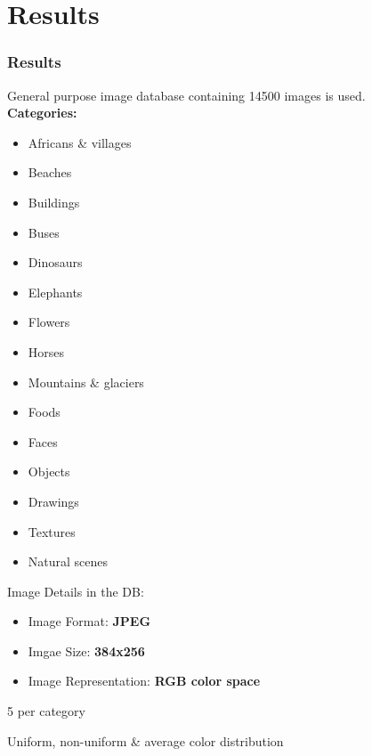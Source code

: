 \documentclass[15pt]{beamer}
\begin{document}
\section{Results}
\begin{frame}
\frametitle{Results}
\pause
General purpose image database containing 14500 images is used.\\[\baselineskip]
\pause
\textbf{Categories: }\\[\baselineskip]
\pause
\begin{multicols}{4}
    \begin{itemize}[label=$\blacksquare$]
        \item Africans \& villages
        \item Beaches
        \item Buildings
        \item Buses
        \item Dinosaurs
        \item Elephants
        \item Flowers
        \item Horses
        \item Mountains \& glaciers
        \item Foods
        \item Faces
        \item Objects
        \item Drawings
        \item Textures
        \item Natural scenes\\[\baselineskip]
    \end{itemize}
\end{multicols}
\pause
Image Details in the DB:
\pause
\begin{itemize}[label=$\blacksquare$]
\item Image Format:\textbf{ JPEG}\\
\pause
\item Imgae Size: \textbf{384x256}\\
\pause
\item Image Representation: \textbf{RGB color space}\\[\baselineskip]
\end{itemize}

\pause
\begin{description}[font=$\blacksquare$\scshape\bfseries]

\item[ Image used:] 5 per category 
\pause
\item[ Image Types :] Uniform, non-uniform \& average color distribution
\end{description}

\end{frame}
\end{document}
